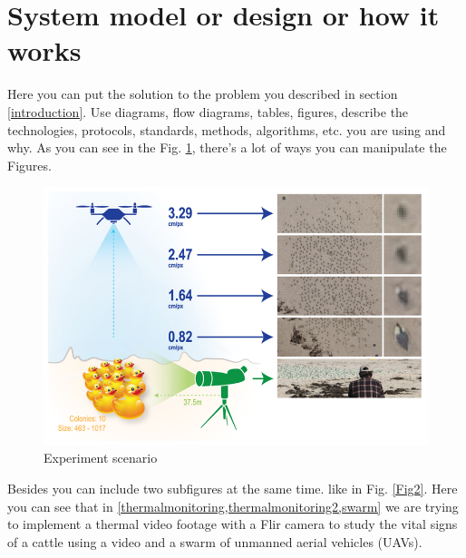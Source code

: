 \documentclass{IEEEtran}
\begin{document}
\section{System model or design or how it works }\label{systemModel}
Here you can put the solution to the problem you described in section \ref{introduction}. Use diagrams, flow diagrams, tables, figures, describe the technologies, protocols, standards, methods, algorithms, etc. you are using and why. 
As you can see in the Fig. \ref{thermalmonitoring}, there's a lot of ways you can manipulate the  Figures. 

\begin{figure}[!htbp]
 \centering
		\includegraphics[width=7 cm]{animalmonitoring.png} 
        \caption{Experiment scenario}  
        \label{thermalmonitoring} 
        
\end{figure}  

Besides you can include two subfigures at the same time. like in Fig. \ref{Fig2}. Here you can see that in \cref{thermalmonitoring,thermalmonitoring2,swarm} we are trying to implement a thermal video footage with a Flir camera to study the vital signs of a cattle using a video and a swarm of unmanned aerial vehicles (UAVs). 
\end{document}
